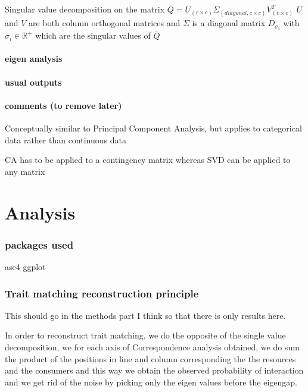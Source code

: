 \documentclass{article}
\begin{document}
Singular value decomposition on the matrix $\overline{Q} = U_{(r\times c)} \Sigma_{(diagonal, c\times c)} V_{(c \times c)}^T$ 
$U$ and $V$ are both column orthogonal matrices and $\Sigma$ is a diagonal matrix $D_{\sigma_i}$ with $\sigma_i \in \mathbb{R}^+$ which are the singular values of $\overline{Q}$


\paragraph{eigen analysis}

\paragraph{usual outputs}
\paragraph{comments (to remove later)}
Conceptually similar to Principal Component Analysis, but applies to categorical data rather than continuous data

CA has to be applied to a contingency matrix whereas SVD can be applied to any matrix






\section{Analysis}

\subsubsection{packages used}

ase4 ggplot

\subsubsection{Trait matching reconstruction principle}

This should go in the methods part I think so that there is only results here.

In order to reconstruct trait matching, we do the opposite of the single value decomposition, we for each axis of Correspondence analysis obtained, we do sum the product of the positions in line and column corresponding the the resources and the consumers and this way we obtain the observed probability of interaction and we get rid of the noise by picking only the eigen values before the eigengap.
\end{document}

